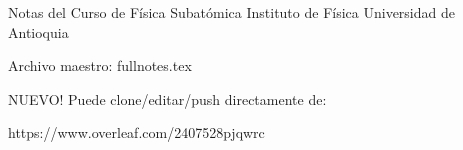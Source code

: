 Notas del Curso de Física Subatómica
Instituto de Física 
Universidad de Antioquia

Archivo maestro: fullnotes.tex

NUEVO!
Puede clone/editar/push directamente de:

https://www.overleaf.com/2407528pjqwrc


